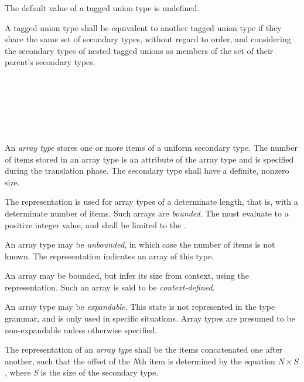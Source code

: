 \specsubsubitem
The default value of a tagged union type is undefined.

\specsubsubitem
A tagged union type shall be equivalent to another tagged union type if they
share the same set of secondary types, without regard to order, and considering
the secondary types of nested tagged unions as members of the set of their
parent's secondary types.


\begin{grammar}
 \\
	\terminal{[} \terminal{]}  \\
	\terminal{[}  \terminal{]}  \\
	\terminal{[} \terminal{*} \terminal{]}  \\
	\terminal{[} \terminal{\_} \terminal{]}  \\
\end{grammar}

\specsubsubitem
An \textit{array type} stores one or more items of a uniform secondary type.
The number of items stored in an array type is an attribute of the array type
and is specified during the translation phase. The secondary type shall have a
definite, nonzero size.

\specsubsubitem
The  representation is used for array types of a
determinate length, that is, with a determinate number of items. Such arrays
are \textit{bounded}. The  must evaluate to a positive
integer value, and shall be limited to the .

\specsubsubitem
An array type may be \textit{unbounded}, in which case the number of items is
not known. The \terminal{*} representation indicates an array of this type.

\specsubsubitem
An array may be bounded, but infer its size from context, using the
\terminal{\_} representation. Such an array is said to be
\textit{context-defined}.

\specsubsubitem
An array type may be \textit{expandable}. This state is not represented in the
type grammar, and is only used in specific situations. Array types are presumed
to be non-expandable unless otherwise specified.

\specsubsubitem
The representation of an \textit{array type} shall be the items concatenated one
after another, such that the offset of the \textit{N}th item is determined by
the equation $N \times S$, where \textit{S} is the size of the secondary type.

